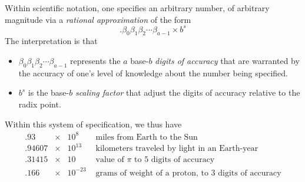 Within scientific notation, one specifies an arbitrary number, of
arbitrary magnitude via a {\em rational approximation} of the form
\[ . \beta_0 \beta_1 \beta_2 \cdots \beta_{a-1} \times b^s \]
The interpretation is that
\begin{itemize}
\item
$\beta_0 \beta_1 \beta_2 \cdots \beta_{a-1}$ represents the $a$
  base-$b$ {\em digits of accuracy} that are warranted by the accuracy
  of one's level of knowledge about the number being specified.

\item
$b^s$ is the base-$b$ {\em scaling factor} that adjust the digits of
  accuracy relative to the radix point.
\end{itemize}
Within this system of specification, we thus have
\[ \begin{array}{lcll}
.93    & \times & 10^8     & \mbox{ miles from Earth to the Sun} \\
.94607 & \times & 10^{13}  & \mbox{ kilometers traveled by light in an Earth-year} \\
.31415 & \times & 10       & \mbox{ value of $\pi$ to $5$ digits of accuracy} \\
.166   & \times & 10^{-23} & \mbox{ grams of weight of a proton, to $3$ digits of accuracy}
\end{array}
\]

